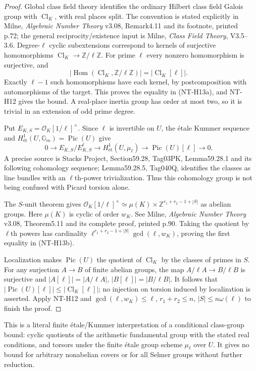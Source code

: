 \begin{proof}
Global class field theory identifies the ordinary Hilbert class field
Galois group with $\operatorname{Cl}_K$, with real places split.
The convention is stated explicitly in Milne, \emph{Algebraic Number
Theory} v3.08, Remark4.11 and its footnote, printed p.72; the general
reciprocity/existence input is Milne, \emph{Class Field Theory}, V3.5--3.6.
Degree-$\ell$ cyclic subextensions correspond to kernels of surjective
homomorphisms $\operatorname{Cl}_K\to\mathbb Z/\ell\mathbb Z$.
For prime $\ell$ every nonzero homomorphism is surjective, and
\[
 |\operatorname{Hom}(\operatorname{Cl}_K,\mathbb Z/\ell\mathbb Z)|
      =|\operatorname{Cl}_K[\ell]|.
\]
Exactly $\ell-1$ such homomorphisms have each kernel, by postcomposition
with automorphisms of the target. This proves the equality in
(NT-H13a), and NT-H12 gives the bound. A real-place inertia group has
order at most two, so it is trivial in an extension of odd prime degree.

Put $E_{K,S}=\mathcal O_K[1/\ell]^\times$. Since $\ell$ is invertible
on $U$, the étale Kummer sequence and
$H^1_{\text{ét}}(U,\mathbb G_m)=\operatorname{Pic}(U)$ give
\[
 0\longrightarrow
 E_{K,S}/E_{K,S}^{\ell}
 \longrightarrow H^1_{\text{ét}}(U,\mu_\ell)
 \longrightarrow\operatorname{Pic}(U)[\ell]
 \longrightarrow0.                                    \tag{NT-H13c}
\]
A precise source is Stacks Project, Section59.28, Tag03PK,
Lemma59.28.1 and its following cohomology sequence; Lemma59.28.5,
Tag040Q, identifies the classes as line bundles with an $\ell$th-power
trivialization. Thus this cohomology group is not being confused with
Picard torsion alone.

The $S$-unit theorem gives
$\mathcal O_K[1/\ell]^\times\simeq\mu(K)\times
\mathbb Z^{r_1+r_2-1+|S|}$ as abelian groups. Here $\mu(K)$ is cyclic
of order $w_K$. See Milne, \emph{Algebraic Number Theory} v3.08,
Theorem5.11 and its complete proof, printed p.90. Taking the quotient
by $\ell$th powers has cardinality
$\ell^{r_1+r_2-1+|S|}\gcd(\ell,w_K)$, proving the first equality in
(NT-H13b).

Localization makes $\operatorname{Pic}(U)$ the quotient of
$\operatorname{Cl}_K$ by the classes of primes in $S$. For any
surjection $A\to B$ of finite abelian groups, the map
$A/\ell A\to B/\ell B$ is surjective and
$|A[\ell]|=|A/\ell A|$, $|B[\ell]|=|B/\ell B|$.
It follows that $|\operatorname{Pic}(U)[\ell]|
\le|\operatorname{Cl}_K[\ell]|$; no injection on torsion induced by
localization is asserted. Apply NT-H12 and
$\gcd(\ell,w_K)\le\ell$, $r_1+r_2\le n$,
$|S|\le n\omega(\ell)$ to finish the proof.
\end{proof}
This is a literal finite étale/Kummer interpretation of a conditional
class-group bound: cyclic quotients of the arithmetic fundamental
group with the stated real conditions, and torsors under the finite
étale group scheme $\mu_\ell$ over $U$. It gives no bound for arbitrary
nonabelian covers or for all Selmer groups without further reduction.
